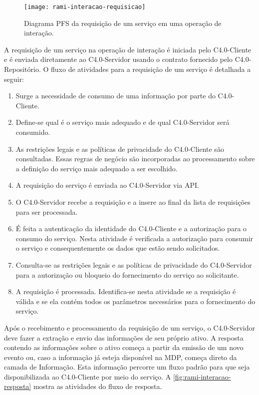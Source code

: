 \begin{figure}[th]
	\centering
	\texttt{[image: rami-interacao-requisicao]}
	\caption{Diagrama PFS da requisição de um serviço em uma operação de interação.}
	\label{fig:rami-interacao-requisicao}
\end{figure}

A requisição de um serviço na operação de interação é iniciada pelo C4.0-Cliente e é enviada diretamente ao C4.0-Servidor usando o contrato fornecido pelo C4.0-Repositório. O fluxo de atividades para a requisição de um serviço é detalhada a seguir:

\begin{enumerate}

	\item Surge a necessidade de consumo de uma informação por parte do C4.0-Cliente.

	\item Define-se qual é o serviço mais adequado e de qual C4.0-Servidor será consumido.

	\item As restrições legais e as políticas de privacidade do C4.0-Cliente são consultadas. Essas regras de negócio são incorporadas ao processamento sobre a definição do serviço mais adequado a ser escolhido.

	\item A requisição do serviço é enviada ao C4.0-Servidor via API.

	\item O C4.0-Servidor recebe a requisição e a insere ao final da lista de requisições para ser processada.

	\item É feita a autenticação da identidade do C4.0-Cliente e a autorização para o consumo do serviço. Nesta atividade é verificada a autorização para consumir o serviço e consequentemente os dados que estão sendo solicitados.

	\item Consulta-se as restrições legais e as políticas de privacidade do C4.0-Servidor para a autorização ou bloqueio do fornecimento do serviço ao solicitante.

	\item A requisição é processada. Identifica-se nesta atividade se a requisição é válida e se ela contém todos os parâmetros necessários para o fornecimento do serviço.

\end{enumerate}

Após o recebimento e processamento da requisição de um serviço, o C4.0-Servidor deve fazer a extração e envio das informações de seu próprio ativo. A resposta contendo as informações sobre o ativo começa a partir da emissão de um novo evento ou, caso a informação já esteja disponível na MDP, começa direto da camada de Informação. Esta informação percorre um fluxo padrão para que seja disponibilizada ao C4.0-Cliente por meio do serviço. A \autoref{fig:rami-interacao-resposta} mostra as atividades do fluxo de resposta.


